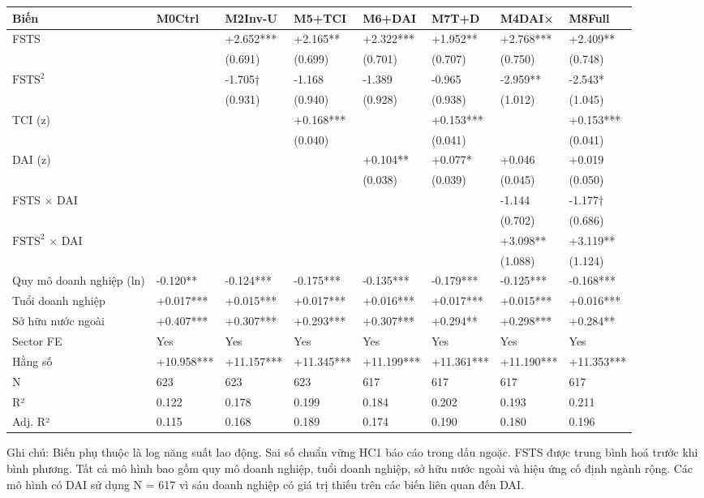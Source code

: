 \documentclass[12pt,a4paper]{article}
\begin{document}
\begin{longtable}[]{@{}llllllll@{}}
\toprule\noalign{}
Biến & M0Ctrl & M2Inv-U & M5+TCI & M6+DAI & M7T+D & M4DAI× & M8Full \\
\midrule\noalign{}
\endhead
\bottomrule\noalign{}
\endlastfoot
FSTS & & +2.652*** & +2.165** & +2.322*** & +1.952** & +2.768*** &
+2.409** \\
& & (0.691) & (0.699) & (0.701) & (0.707) & (0.750) & (0.748) \\
\(\mathrm{FSTS}^2\) & & -1.705† & -1.168 & -1.389 & -0.965 & -2.959** &
-2.543* \\
& & (0.931) & (0.940) & (0.928) & (0.938) & (1.012) & (1.045) \\
TCI (z) & & & +0.168*** & & +0.153*** & & +0.153*** \\
& & & (0.040) & & (0.041) & & (0.041) \\
DAI (z) & & & & +0.104** & +0.077* & +0.046 & +0.019 \\
& & & & (0.038) & (0.039) & (0.045) & (0.050) \\
FSTS × DAI & & & & & & -1.144 & -1.177† \\
& & & & & & (0.702) & (0.686) \\
\(\mathrm{FSTS}^2\) × DAI & & & & & & +3.098** & +3.119** \\
& & & & & & (1.088) & (1.124) \\
Quy mô doanh nghiệp (ln) & -0.120** & -0.124*** & -0.175*** & -0.135***
& -0.179*** & -0.125*** & -0.168*** \\
Tuổi doanh nghiệp & +0.017*** & +0.015*** & +0.017*** & +0.016*** &
+0.017*** & +0.015*** & +0.016*** \\
Sở hữu nước ngoài & +0.407*** & +0.307*** & +0.293*** & +0.307*** &
+0.294** & +0.298*** & +0.284** \\
Sector FE & Yes & Yes & Yes & Yes & Yes & Yes & Yes \\
Hằng số & +10.958*** & +11.157*** & +11.345*** & +11.199*** & +11.361***
& +11.190*** & +11.353*** \\
N & 623 & 623 & 623 & 617 & 617 & 617 & 617 \\
R² & 0.122 & 0.178 & 0.199 & 0.184 & 0.202 & 0.193 & 0.211 \\
Adj. R² & 0.115 & 0.168 & 0.189 & 0.174 & 0.190 & 0.180 & 0.196 \\
\end{longtable}

Ghi chú: Biến phụ thuộc là log năng suất lao động. Sai số chuẩn vững HC1
báo cáo trong dấu ngoặc. FSTS được trung bình hoá trước khi bình phương.
Tất cả mô hình bao gồm quy mô doanh nghiệp, tuổi doanh nghiệp, sở hữu
nước ngoài và hiệu ứng cố định ngành rộng. Các mô hình có DAI sử dụng N
= 617 vì sáu doanh nghiệp có giá trị thiếu trên các biến liên quan đến
DAI.
\end{document}
